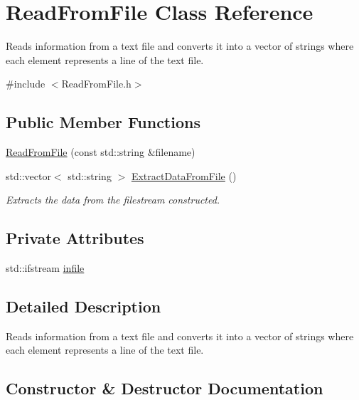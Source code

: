\hypertarget{class_read_from_file}{}\section{Read\+From\+File Class Reference}
\label{class_read_from_file}


Reads information from a text file and converts it into a vector of strings where each element represents a line of the text file.  




{\ttfamily \#include $<$Read\+From\+File.\+h$>$}

\subsection*{Public Member Functions}
\begin{DoxyCompactItemize}
\item 
\hyperlink{class_read_from_file_a47cb0c6b3d0211a1de1bb11cf33aa718}{Read\+From\+File} (const std\+::string \&filename)
\item 
std\+::vector$<$ std\+::string $>$ \hyperlink{class_read_from_file_af04c3cbdbd3931d6171370ab8756c68d}{Extract\+Data\+From\+File} ()
\begin{DoxyCompactList}\small\item\em Extracts the data from the filestream constructed. \end{DoxyCompactList}\end{DoxyCompactItemize}
\subsection*{Private Attributes}
\begin{DoxyCompactItemize}
\item 
std\+::ifstream \hyperlink{class_read_from_file_a086ac29a97a4e98206969e1ea7f4a608}{infile}
\end{DoxyCompactItemize}


\subsection{Detailed Description}
Reads information from a text file and converts it into a vector of strings where each element represents a line of the text file. 

\subsection{Constructor \& Destructor Documentation}
\mbox{\label{class_read_from_file_a47cb0c6b3d0211a1de1bb11cf33aa718}} 
